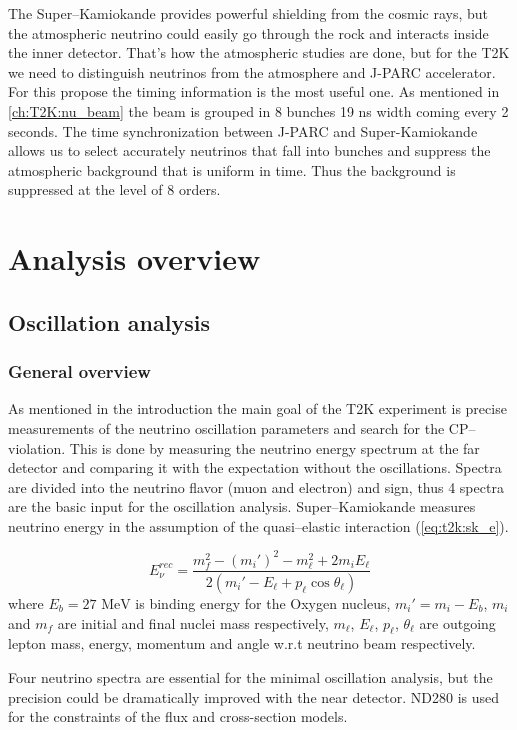 \documentclass[../main.tex]{subfiles}
\begin{document}
The Super--Kamiokande provides powerful shielding from the cosmic rays, but the atmospheric neutrino could easily go through the rock and interacts inside the inner detector. That's how the atmospheric studies are done, but for the T2K we need to distinguish neutrinos from the atmosphere and J-PARC accelerator. For this propose the timing information is the most useful one. As mentioned in \autoref{ch:T2K:nu_beam} the beam is grouped in 8 bunches 19 ns width coming every 2 seconds. The time synchronization between J-PARC and Super-Kamiokande allows us to select accurately neutrinos that fall into bunches and suppress the atmospheric background that is uniform in time. Thus the background is suppressed at the level of 8 orders.


\section{Analysis overview}
\subsection{Oscillation analysis}
\subsubsection{General overview}
As mentioned in the introduction the main goal of the T2K experiment is precise measurements of the neutrino oscillation parameters and search for the CP--violation. This is done by measuring the neutrino energy spectrum at the far detector and comparing it with the expectation without the oscillations. Spectra are divided into the neutrino flavor (muon and electron) and sign, thus 4 spectra are the basic input for the oscillation analysis. Super--Kamiokande measures neutrino energy in the assumption of the quasi--elastic interaction (\autoref{eq:t2k:sk_e}).

\begin{equation}
\label{eq:t2k:sk_e}
E_\nu^{rec}=\frac{m_f^2-(m_i')^2-m_\ell^2+2m_iE_\ell}{2\left(m_i'-E_\ell+p_\ell\cos\theta_\ell\right)}
\end{equation}
where $E_b = 27\text{ MeV}$ is binding energy for the Oxygen nucleus, $m_i'=m_i-E_b$, $m_i$ and $m_f$ are initial and final nuclei mass respectively, $m_\ell$, $E_\ell$, $p_\ell$, $\theta_\ell$ are outgoing lepton mass, energy, momentum and angle w.r.t neutrino beam respectively. 

Four neutrino spectra are essential for the minimal oscillation analysis, but the precision could be dramatically improved with the near detector. ND280 is used for the constraints of the flux and cross-section models. 
\end{document}
